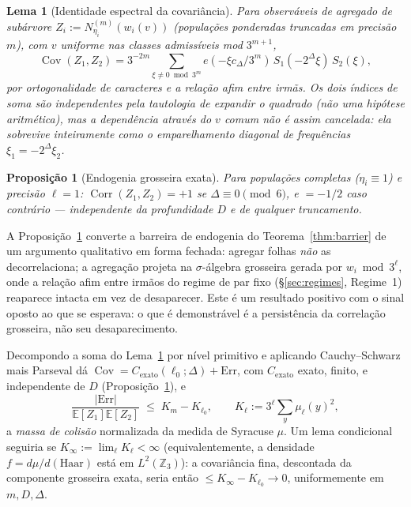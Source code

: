 \documentclass[11pt]{article}
\newtheorem{proposition}[theorem]{Proposição}
\newtheorem{lemma}[theorem]{Lema}
\theoremstyle{definition}
\theoremstyle{remark}
\DeclareMathOperator{\Cov}{Cov}
\DeclareMathOperator{\Corr}{Corr}
\begin{document}
\begin{lemma}[Identidade espectral da covariância]\label{lem:cov-spectral}
Para observáveis de agregado de subárvore $Z_i:=N_{\eta_i}^{(m)}(w_i(v))$
(populações ponderadas truncadas em precisão $m$), com $v$ uniforme
nas classes admissíveis mod $3^{m+1}$,
\[
  \Cov(Z_1,Z_2) = 3^{-2m}\sum_{\xi\ne 0 \bmod 3^m}
  e(-\xi c_\Delta/3^m)\, S_1(-2^\Delta\xi)\, S_2(\xi),
\]
por ortogonalidade de caracteres e a relação afim entre irmãs. Os dois
índices de soma são independentes pela tautologia de expandir o
quadrado (não uma hipótese aritmética), mas a dependência através do
$v$ comum não é assim cancelada: ela sobrevive inteiramente como o
emparelhamento diagonal de frequências $\xi_1=-2^\Delta\xi_2$.
\end{lemma}

\begin{proposition}[Endogenia grosseira exata]\label{prop:exact-endogeny}
Para populações completas ($\eta_i\equiv 1$) e precisão $\ell=1$:
$\Corr(Z_1,Z_2)=+1$ se $\Delta\equiv 0\pmod 6$, e $=-1/2$ caso
contrário --- independente da profundidade $D$ e de qualquer
truncamento.
\end{proposition}

A Proposição~\ref{prop:exact-endogeny} converte a barreira de
endogenia do Teorema~\ref{thm:barrier} de um argumento qualitativo em
forma fechada: agregar folhas \emph{não} as decorrelaciona; a
agregação projeta na $\sigma$-álgebra grosseira gerada por
$w_i\bmod 3^\ell$, onde a relação afim entre irmãos do regime de par
fixo (\S\ref{sec:regimes}, Regime~1) reaparece intacta em vez de
desaparecer. Este é um resultado positivo com o sinal oposto ao que se
esperava: o que é demonstrável é a persistência da correlação
grosseira, não seu desaparecimento.

Decompondo a soma do Lema~\ref{lem:cov-spectral} por nível primitivo e
aplicando Cauchy--Schwarz mais Parseval dá $\Cov =
C_{\mathrm{exato}}(\ell_0;\Delta) + \mathrm{Err}$, com
$C_{\mathrm{exato}}$ exato, finito, e independente de $D$
(Proposição~\ref{prop:exact-endogeny}), e
\[
  \frac{|\mathrm{Err}|}{\mathbb{E}[Z_1]\mathbb{E}[Z_2]} \;\le\;
  K_m - K_{\ell_0}, \qquad K_\ell := 3^\ell \sum_y \mu_\ell(y)^2,
\]
a \emph{massa de colisão} normalizada da medida de Syracuse $\mu$. Um
lema condicional seguiria se $K_\infty := \lim_\ell K_\ell < \infty$
(equivalentemente, a densidade $f=d\mu/d(\text{Haar})$ está em
$L^2(\mathbb{Z}_3)$): a covariância fina, descontada da componente
grosseira exata, seria então $\le K_\infty - K_{\ell_0}\to 0$,
uniformemente em $m,D,\Delta$.
\end{document}
